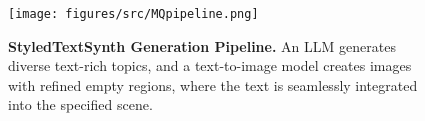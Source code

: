 \begin{figure}
    \centering
    \texttt{[image: figures/src/MQpipeline.png]}
    \caption{
    \textbf{StyledTextSynth Generation Pipeline.} An LLM generates diverse text-rich topics, and a text-to-image model creates images with refined empty regions, where the text is seamlessly integrated into the specified scene.
    }
    \label{fig:middle_quality_ppl}
\end{figure}